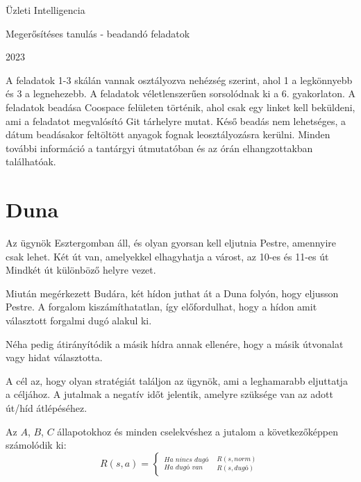 \documentclass[english]{article}
\begin{document}
\begin{titlepage}
\centering

\vspace{4cm} 

\Huge

Üzleti Intelligencia

\vspace{2cm} 

\Large

Megerősítéses tanulás - beadandó feladatok

\vspace{0.5cm}

2023 %

\vspace{2cm} 

\normalsize

A feladatok 1-3 skálán vannak osztályozva nehézség szerint, ahol 1 a legkönnyebb és 3 a legnehezebb. A feladatok véletlenszerűen sorsolódnak ki a 6. gyakorlaton. A feladatok beadása Coospace felületen történik, ahol csak egy linket kell beküldeni, ami a feladatot megvalósító Git tárhelyre mutat. Késő beadás nem lehetséges, a dátum beadásakor feltöltött anyagok fognak leosztályozásra kerülni. Minden további információ a tantárgyi útmutatóban és az órán elhangzottakban találhatóak.
\end{titlepage}

\section{Duna}
Az ügynök Esztergomban áll, és olyan gyorsan kell eljutnia Pestre, amennyire csak lehet. Két út van, amelyekkel elhagyhatja a várost, az 10-es és 11-es út Mindkét út különböző helyre vezet.

Miután megérkezett Budára, két hídon juthat át a Duna folyón, hogy eljusson Pestre. A forgalom kiszámíthatatlan, így előfordulhat, hogy a hídon amit választott forgalmi dugó alakul ki.

Néha pedig átirányítódik a másik hídra annak ellenére, hogy a másik útvonalat vagy hidat választotta.

A cél az, hogy olyan stratégiát találjon az ügynök, ami a leghamarabb eljuttatja a céljához. A jutalmak a negatív időt jelentik, amelyre szüksége van az adott út/híd átlépéséhez.

Az $A$, $B$, $C$  állapotokhoz és minden cselekvéshez a jutalom a következőképpen számolódik ki:
\[R(s,a) = 
\begin{cases}
_{\textit{Ha dugó van}}^{\textit{Ha nincs dugó}} & _{R(s,\textit{dugó})}^{R(s,\textit{norm})}
\end{cases}
\]
\end{document}
